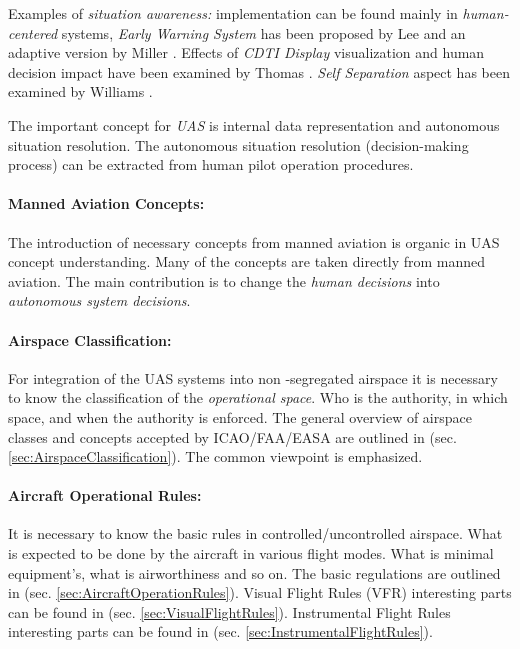 Examples of \emph{situation awareness:} implementation can be found mainly in \emph{human-centered} systems, \emph{Early Warning System} has been proposed by Lee \cite{lee2002collision} and an adaptive version by Miller \cite{miller2002adaptive}. Effects of \emph{CDTI Display} visualization and human decision impact have been examined by Thomas \cite{thomas2005effects}. \emph{Self Separation} aspect has been examined by Williams \cite{williams1983self}.

\noindent
The important concept for \emph{UAS} is internal data representation and autonomous situation resolution. The autonomous situation resolution (decision-making process) can be extracted from human pilot operation procedures.  

\paragraph{Manned Aviation Concepts:} The introduction of necessary concepts from manned aviation is organic in UAS concept understanding. 
Many of the concepts are taken directly from manned aviation. The main contribution is to change the \emph{human decisions} into \emph{autonomous system decisions}.

\paragraph{Airspace Classification:} For integration of the UAS systems into non -segregated airspace it is necessary to know the classification of the \emph{operational space}. Who is the authority, in which space, and when the authority is enforced. The general overview of airspace classes and concepts accepted by ICAO/FAA/EASA are outlined in (sec. \ref{sec:AirspaceClassification}). The common viewpoint is emphasized. 
    
\paragraph{Aircraft Operational Rules:} It is necessary to know the basic rules in controlled/uncontrolled airspace. What is expected to be done by the aircraft in various flight modes. What is minimal equipment's, what is airworthiness and so on. The basic regulations are outlined in (sec. \ref{sec:AircraftOperationRules}). Visual Flight Rules (VFR) interesting parts can be found in (sec. \ref{sec:VisualFlightRules}). Instrumental Flight Rules interesting parts can be found in (sec. \ref{sec:InstrumentalFlightRules}).
        

